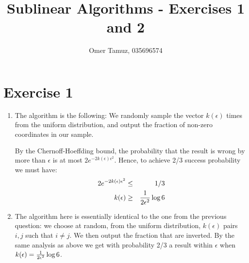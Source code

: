 \documentclass[11pt]{article} \usepackage{amssymb}
\begin{document}
\title{Sublinear Algorithms - Exercises 1 and 2}

 \author{Omer Tamuz, 035696574}
\maketitle

\section{Exercise 1}
\begin{enumerate}
  \item 
    The algorithm is the following: We randomly sample the vector 
    $k(\epsilon)$ times from the uniform distribution, 
    and output the fraction of non-zero coordinates in 
    our sample.

    By the Chernoff-Hoeffding bound, the probability that the result is wrong
    by more than $\epsilon$ is at most $2e^{-2k(\epsilon)\epsilon^2}$. 
    Hence, to achieve 2/3 success probability we must have:
    \begin{eqnarray*}
      2e^{-2k(\epsilon)\epsilon^2} &\leq& 1/3
      \\ k(\epsilon) &\geq& {1\over 2\epsilon^2}\log{6}
    \end{eqnarray*}

    \item 

      The algorithm here is essentially identical to the one from the previous
      question: we choose at random, from the uniform distribution, 
      $k(\epsilon)$ pairs $i,j$ such that $i\neq j$. We then output the fraction
      that are inverted. By the same analysis as above we get with probability
      2/3 a result within $\epsilon$ when 
      $k(\epsilon)={1\over 2\epsilon^2}\log 6$.
\end{enumerate}
\end{document}
